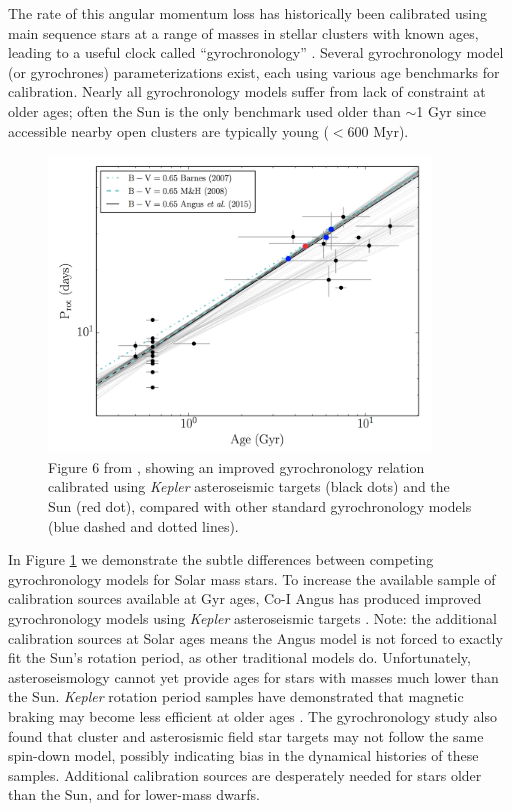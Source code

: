 \documentclass[12pt]{article}
\newcommand{\Kepler}{\textsl{Kepler}\xspace}
\begin{document}
The rate of this angular momentum loss has historically been calibrated using main sequence stars at a range of masses in stellar clusters with known ages, leading to a useful clock called ``gyrochronology'' \citep{barnes2003}. Several gyrochronology model (or gyrochrones) parameterizations exist, each using various age benchmarks for calibration. Nearly all gyrochronology models suffer from lack of constraint at older ages; often the Sun is the only benchmark used older than $\sim$1 Gyr since accessible nearby open clusters are typically young ($<600$ Myr).

\begin{figure}[!t]
\centering
\includegraphics[width=4in]{angus2015_fig6.png}
\caption{Figure 6 from \citet{angus2015}, showing an improved gyrochronology relation calibrated using \Kepler asteroseismic targets (black dots) and the Sun (red dot), compared with other standard gyrochronology models (blue dashed and dotted lines).}
\label{fig:gyro}
\end{figure}


In Figure \ref{fig:gyro} we demonstrate the subtle differences between competing gyrochronology models for Solar mass stars. To increase the available sample of calibration sources available at Gyr ages, Co-I Angus has produced improved gyrochronology models using \Kepler asteroseismic targets \citep{angus2015}. Note: the additional calibration sources at Solar ages means the Angus model is not forced to exactly fit the Sun's rotation period, as other traditional models do. Unfortunately, asteroseismology cannot yet provide ages for stars with masses much lower than the Sun.  \Kepler rotation period samples have demonstrated that magnetic braking may become less efficient at older ages \citep{van-saders2016}.
The \citet{angus2015} gyrochronology study also found that cluster and asterosismic field star targets may not follow the same spin-down model, possibly indicating bias in the dynamical histories of these samples.  Additional calibration sources are desperately needed for stars older than the Sun, and for lower-mass dwarfs.
\end{document}
